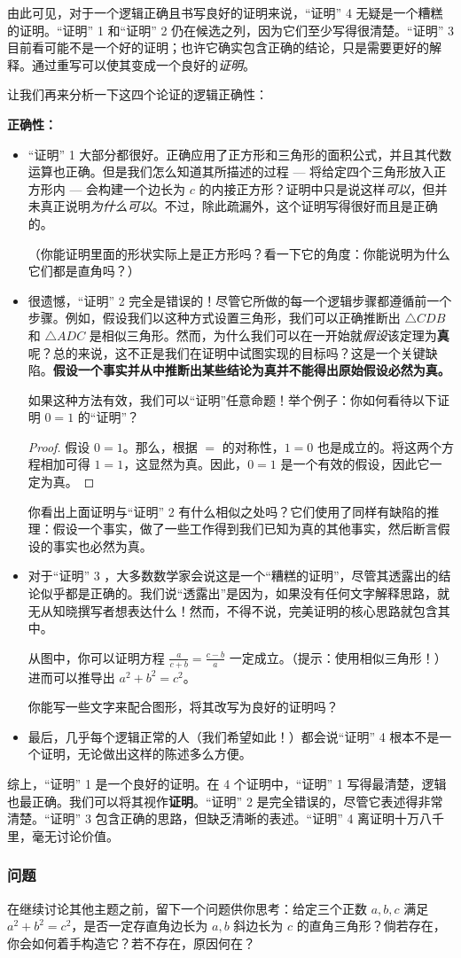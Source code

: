 由此可见，对于一个逻辑正确且书写良好的证明来说，``证明'' 4 无疑是一个糟糕的证明。``证明'' 1 和``证明'' 2 仍在候选之列，因为它们至少写得很清楚。``证明'' 3 目前看可能不是一个好的证明；也许它确实包含正确的结论，只是需要更好的解释。通过重写可以使其变成一个良好的\emph{证明}。

让我们再来分析一下这四个论证的逻辑正确性：

\textbf{正确性：}

\begin{itemize}
    \item ``证明'' 1 大部分都很好。正确应用了正方形和三角形的面积公式，并且其代数运算也正确。但是我们怎么知道其所描述的过程 --- 将给定四个三角形放入正方形内 --- 会构建一个边长为 $c$ 的内接正方形？证明中只是说这样\emph{可以}，但并未真正说明\emph{为什么可以}。不过，除此疏漏外，这个证明写得很好而且是正确的。
    
    （你能证明里面的形状实际上是正方形吗？看一下它的角度：你能说明为什么它们都是直角吗？）
    \item 很遗憾，``证明'' 2 完全是错误的！尽管它所做的每一个逻辑步骤都遵循前一个步骤。例如，假设我们以这种方式设置三角形，我们可以正确推断出 $\triangle CDB$ 和 $\triangle ADC$ 是相似三角形。然而，为什么我们可以在一开始就\emph{假设}该定理为\textbf{真}呢？总的来说，这不正是我们在证明中试图实现的目标吗？这是一个关键缺陷。\textbf{假设一个事实并从中推断出某些结论为真并不能得出原始假设必然为真。}
    
    如果这种方法有效，我们可以``证明''任意命题！举个例子：你如何看待以下证明 $0 = 1$ 的``证明''？
    \begin{proof}
        假设 $0 = 1$。那么，根据 $=$ 的对称性，$1 = 0$ 也是成立的。将这两个方程相加可得 $1 = 1$，这显然为真。因此，$0 = 1$ 是一个有效的假设，因此它一定为真。
    \end{proof}
    你看出上面证明与``证明'' 2 有什么相似之处吗？它们使用了同样有缺陷的推理：假设一个事实，做了一些工作得到我们已知为真的其他事实，然后断言假设的事实也必然为真。
    \item 对于``证明'' 3 ，大多数数学家会说这是一个``糟糕的证明''，尽管其透露出的结论似乎都是正确的。我们说``透露出''是因为，如果没有任何文字解释思路，就无从知晓撰写者想表达什么！然而，不得不说，完美证明的核心思路就包含其中。
    
    从图中，你可以证明方程 $\frac{a}{c+b} = \frac{c-b}{a}$ 一定成立。（提示：使用相似三角形！）进而可以推导出 $a^2 + b^2 = c^2$。

    你能写一些文字来配合图形，将其改写为良好的证明吗？
    \item 最后，几乎每个逻辑正常的人（我们希望如此！）都会说``证明'' 4 根本不是一个证明，无论做出这样的陈述多么方便。
\end{itemize}

综上，``证明'' 1 是一个良好的证明。在 4 个证明中，``证明'' 1 写得最清楚，逻辑也最正确。我们可以将其视作\textbf{证明}。``证明'' 2 是完全错误的，尽管它表述得非常清楚。``证明'' 3 包含正确的思路，但缺乏清晰的表述。``证明'' 4 离证明十万八千里，毫无讨论价值。

\subsubsection*{问题}

在继续讨论其他主题之前，留下一个问题供你思考：给定三个正数 $a,b,c$ 满足 $a^2+b^2=c^2$，是否一定存直角边长为 $a,b$ 斜边长为 $c$ 的直角三角形？倘若存在，你会如何着手构造它？若不存在，原因何在？
